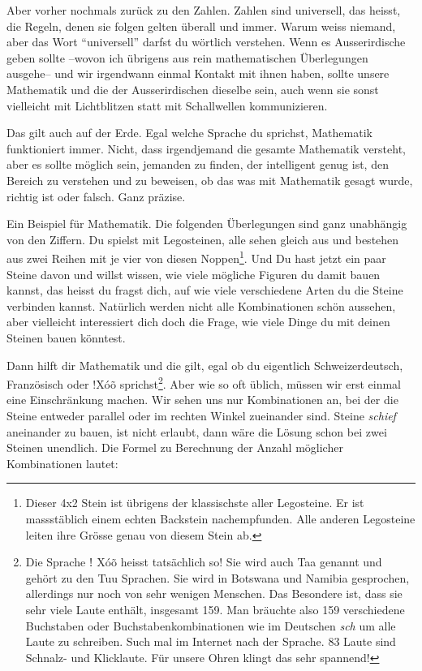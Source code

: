 Aber vorher nochmals zurück zu den Zahlen. Zahlen sind universell, das heisst, die Regeln, denen sie folgen gelten überall und immer. Warum weiss niemand, aber das Wort \enquote{universell} darfst du wörtlich verstehen. Wenn es Ausserirdische geben sollte --wovon ich übrigens aus rein mathematischen Überlegungen ausgehe-- und wir irgendwann einmal Kontakt mit ihnen haben, sollte unsere Mathematik und die der Ausserirdischen dieselbe sein, auch wenn sie sonst vielleicht mit Lichtblitzen statt mit Schallwellen kommunizieren.

Das gilt auch auf der Erde. Egal welche Sprache du sprichst, Mathematik funktioniert immer. Nicht, dass irgendjemand die gesamte Mathematik versteht, aber es sollte möglich sein, jemanden zu finden, der intelligent genug ist, den Bereich zu verstehen und zu beweisen, ob das was mit Mathematik gesagt wurde, richtig ist oder falsch. Ganz präzise.

Ein Beispiel für Mathematik. Die folgenden Überlegungen sind ganz unabhängig von den Ziffern. Du spielst mit Legosteinen, alle sehen gleich aus und bestehen aus zwei Reihen mit je vier von diesen Noppen\footnote{Dieser 4x2 Stein ist übrigens der klassischste aller Legosteine. Er ist massstäblich einem echten Backstein nachempfunden. Alle anderen Legosteine leiten ihre Grösse genau von diesem Stein ab.}. Und Du hast jetzt ein paar Steine davon und willst wissen, wie viele mögliche Figuren du damit bauen kannst, das heisst du fragst dich, auf wie viele verschiedene Arten du die Steine verbinden kannst. Natürlich werden nicht alle Kombinationen schön aussehen, aber vielleicht interessiert dich doch die Frage, wie viele Dinge du mit deinen Steinen bauen könntest.

Dann hilft dir Mathematik und die gilt, egal ob du eigentlich Schweizerdeutsch, Französisch oder $!$X\'{o}\~{o} sprichst\footnote{Die Sprache ǃ X\'{o}\~{o} heisst tatsächlich so! Sie wird auch Taa genannt und gehört zu den Tuu Sprachen. Sie wird in Botswana und Namibia gesprochen, allerdings nur noch von sehr wenigen Menschen. Das Besondere ist, dass sie sehr viele Laute enthält, insgesamt 159. Man bräuchte also 159 verschiedene Buchstaben oder Buchstabenkombinationen wie im Deutschen \textit{sch} um alle Laute zu schreiben. Such mal im Internet nach der Sprache. 83 Laute sind Schnalz- und Klicklaute. Für unsere Ohren klingt das sehr spannend!}. Aber wie so oft üblich, müssen wir erst einmal eine Einschränkung machen. Wir sehen uns nur Kombinationen an, bei der die Steine entweder parallel oder im rechten Winkel zueinander sind. Steine \textit{schief} aneinander zu bauen, ist nicht erlaubt, dann wäre die Lösung schon bei zwei Steinen unendlich. Die Formel zu Berechnung der Anzahl möglicher Kombinationen lautet:

